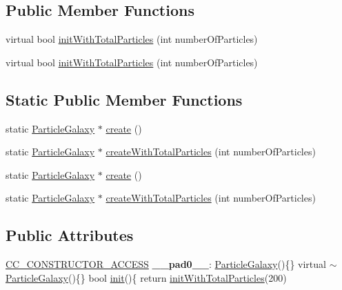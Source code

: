 \subsection*{Public Member Functions}
\begin{DoxyCompactItemize}
\item 
virtual bool \hyperlink{classParticleGalaxy_a4c5f713dc7e1c18d85e38cba943ee2dc}{init\+With\+Total\+Particles} (int number\+Of\+Particles)
\item 
virtual bool \hyperlink{classParticleGalaxy_a13c2c56912e3b0d1fda79599bd9eb8bd}{init\+With\+Total\+Particles} (int number\+Of\+Particles)
\end{DoxyCompactItemize}
\subsection*{Static Public Member Functions}
\begin{DoxyCompactItemize}
\item 
static \hyperlink{classParticleGalaxy}{Particle\+Galaxy} $\ast$ \hyperlink{classParticleGalaxy_adf9a661300a0cad1f23f834bf69e9ecd}{create} ()
\item 
static \hyperlink{classParticleGalaxy}{Particle\+Galaxy} $\ast$ \hyperlink{classParticleGalaxy_a4fba87762831dbc74dac881592e39e14}{create\+With\+Total\+Particles} (int number\+Of\+Particles)
\item 
static \hyperlink{classParticleGalaxy}{Particle\+Galaxy} $\ast$ \hyperlink{classParticleGalaxy_aa8cc941e8f4abbf48f627da5e13e2288}{create} ()
\item 
static \hyperlink{classParticleGalaxy}{Particle\+Galaxy} $\ast$ \hyperlink{classParticleGalaxy_a9164802951fb899f007f8922a2590da5}{create\+With\+Total\+Particles} (int number\+Of\+Particles)
\end{DoxyCompactItemize}
\subsection*{Public Attributes}
\begin{DoxyCompactItemize}
\item 
\mbox{\label{classParticleGalaxy_ae3a4131fb840a06cbd08d2b65c2fca25}} 
\hyperlink{_2cocos2d_2cocos_2base_2ccConfig_8h_a25ef1314f97c35a2ed3d029b0ead6da0}{C\+C\+\_\+\+C\+O\+N\+S\+T\+R\+U\+C\+T\+O\+R\+\_\+\+A\+C\+C\+E\+SS} {\bfseries \+\_\+\+\_\+pad0\+\_\+\+\_\+}\+: \hyperlink{classParticleGalaxy}{Particle\+Galaxy}()\{\} virtual $\sim$\hyperlink{classParticleGalaxy}{Particle\+Galaxy}()\{\} bool \hyperlink{classParticleSystem_a65c05b30432f6e8aeb45ba018f3a8d3f}{init}()\{ return \hyperlink{classParticleGalaxy_a4c5f713dc7e1c18d85e38cba943ee2dc}{init\+With\+Total\+Particles}(200)
\end{DoxyCompactItemize}
